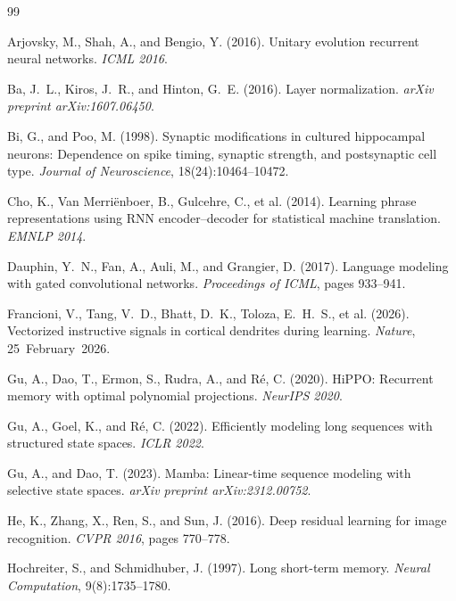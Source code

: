 \documentclass[11pt,a4paper]{article}
\begin{document}

\begin{thebibliography}{99}

Arjovsky, M., Shah, A., and Bengio, Y. (2016).
Unitary evolution recurrent neural networks.
\textit{ICML 2016}.

Ba, J.~L., Kiros, J.~R., and Hinton, G.~E. (2016).
Layer normalization.
\textit{arXiv preprint arXiv:1607.06450}.

Bi, G., and Poo, M. (1998).
Synaptic modifications in cultured hippocampal neurons:
Dependence on spike timing, synaptic strength, and postsynaptic cell type.
\textit{Journal of Neuroscience}, 18(24):10464--10472.

Cho, K., Van Merri\"{e}nboer, B., Gulcehre, C., et al. (2014).
Learning phrase representations using RNN encoder--decoder for
statistical machine translation.
\textit{EMNLP 2014}.

Dauphin, Y.~N., Fan, A., Auli, M., and Grangier, D. (2017).
Language modeling with gated convolutional networks.
\textit{Proceedings of ICML}, pages 933--941.

Francioni, V., Tang, V.~D., Bhatt, D.~K., Toloza, E.~H.~S., et al. (2026).
Vectorized instructive signals in cortical dendrites during learning.
\textit{Nature}, 25~February~2026.

Gu, A., Dao, T., Ermon, S., Rudra, A., and R\'{e}, C. (2020).
HiPPO: Recurrent memory with optimal polynomial projections.
\textit{NeurIPS 2020}.

Gu, A., Goel, K., and R\'{e}, C. (2022).
Efficiently modeling long sequences with structured state spaces.
\textit{ICLR 2022}.

Gu, A., and Dao, T. (2023).
Mamba: Linear-time sequence modeling with selective state spaces.
\textit{arXiv preprint arXiv:2312.00752}.

He, K., Zhang, X., Ren, S., and Sun, J. (2016).
Deep residual learning for image recognition.
\textit{CVPR 2016}, pages 770--778.

Hochreiter, S., and Schmidhuber, J. (1997).
Long short-term memory.
\textit{Neural Computation}, 9(8):1735--1780.


\end{thebibliography}
\end{document}
